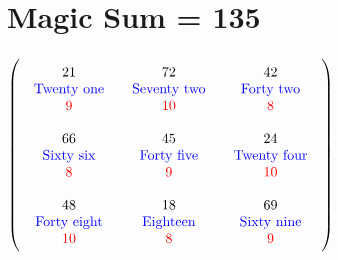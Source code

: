 \documentclass{article}
\begin{document}
\vspace{2em} 
\section{Magic Sum = 135}$ \left( \begin{array}{ccc}
\begin{array}{c}
\rule{0pt}{1.5em}21 \\ 
\text{\color{blue}Twenty one} \\ 
\color{red}9 \vspace{.5em} 
\end{array} & \begin{array}{c}
\rule{0pt}{1.5em}72 \\ 
\text{\color{blue}Seventy two} \\ 
\color{red}10 \vspace{.5em} 
\end{array} & \begin{array}{c}
\rule{0pt}{1.5em}42 \\ 
\text{\color{blue}Forty two} \\ 
\color{red}8 \vspace{.5em} 
\end{array}\\ 
\begin{array}{c}
\rule{0pt}{1.5em}66 \\ 
\text{\color{blue}Sixty six} \\ 
\color{red}8 \vspace{.5em} 
\end{array} & \begin{array}{c}
\rule{0pt}{1.5em}45 \\ 
\text{\color{blue}Forty five} \\ 
\color{red}9 \vspace{.5em} 
\end{array} & \begin{array}{c}
\rule{0pt}{1.5em}24 \\ 
\text{\color{blue}Twenty four} \\ 
\color{red}10 \vspace{.5em} 
\end{array}\\ 
\begin{array}{c}
\rule{0pt}{1.5em}48 \\ 
\text{\color{blue}Forty eight} \\ 
\color{red}10 \vspace{.5em} 
\end{array} & \begin{array}{c}
\rule{0pt}{1.5em}18 \\ 
\text{\color{blue}Eighteen} \\ 
\color{red}8 \vspace{.5em} 
\end{array} & \begin{array}{c}
\rule{0pt}{1.5em}69 \\ 
\text{\color{blue}Sixty nine} \\ 
\color{red}9 \vspace{.5em} 
\end{array}\end{array} \right) $
\end{document}
